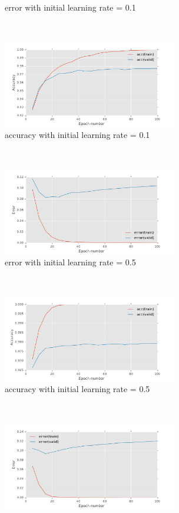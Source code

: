 \documentclass[11pt]{article}
\begin{document}
\begin{figure}[t!]
\begin{subfigure}[t]{0.45\textwidth}
        \caption{error with initial learning rate = 0.1}
    \end{subfigure}
	~
    \begin{subfigure}[t]{0.45\textwidth}
        \centering
        \includegraphics[height=1.5in]{acc_with_init_LR_0_1.pdf}
        \caption{accuracy with initial learning rate = 0.1}
    \end{subfigure}
	~
    \begin{subfigure}[t]{0.45\textwidth}
        \centering
        \includegraphics[height=1.5in]{error_with_init_LR_0_5.pdf}
        \caption{error with initial learning rate = 0.5}
    \end{subfigure}
	~
    \begin{subfigure}[t]{0.45\textwidth}
        \centering
        \includegraphics[height=1.5in]{acc_with_init_LR_0_5.pdf}
        \caption{accuracy with initial learning rate = 0.5}
    \end{subfigure}
    ~
    \begin{subfigure}[t]{0.45\textwidth}
        \centering
        \includegraphics[height=1.5in]{error_with_init_LR_1_0.pdf}

\end{subfigure}
\end{figure}
\end{document}
